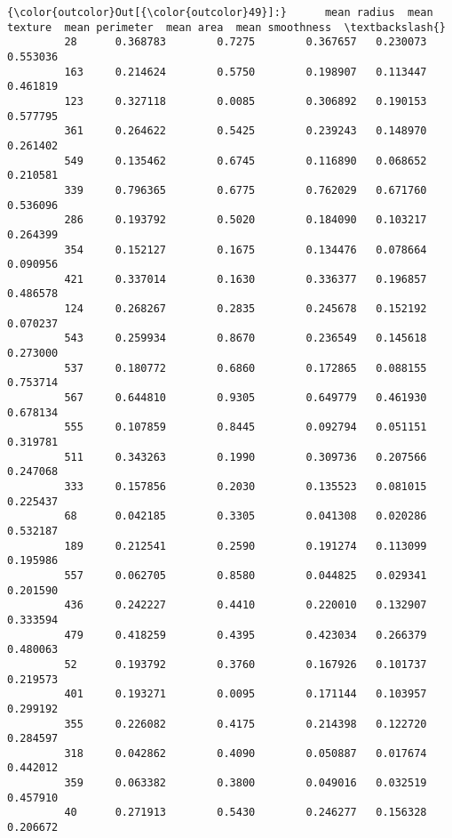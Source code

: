 \documentclass[11pt]{article}
\begin{document}
\begin{Verbatim}[commandchars=\\\{\}]
{\color{outcolor}Out[{\color{outcolor}49}]:}      mean radius  mean texture  mean perimeter  mean area  mean smoothness  \textbackslash{}
         28      0.368783        0.7275        0.367657   0.230073         0.553036   
         163     0.214624        0.5750        0.198907   0.113447         0.461819   
         123     0.327118        0.0085        0.306892   0.190153         0.577795   
         361     0.264622        0.5425        0.239243   0.148970         0.261402   
         549     0.135462        0.6745        0.116890   0.068652         0.210581   
         339     0.796365        0.6775        0.762029   0.671760         0.536096   
         286     0.193792        0.5020        0.184090   0.103217         0.264399   
         354     0.152127        0.1675        0.134476   0.078664         0.090956   
         421     0.337014        0.1630        0.336377   0.196857         0.486578   
         124     0.268267        0.2835        0.245678   0.152192         0.070237   
         543     0.259934        0.8670        0.236549   0.145618         0.273000   
         537     0.180772        0.6860        0.172865   0.088155         0.753714   
         567     0.644810        0.9305        0.649779   0.461930         0.678134   
         555     0.107859        0.8445        0.092794   0.051151         0.319781   
         511     0.343263        0.1990        0.309736   0.207566         0.247068   
         333     0.157856        0.2030        0.135523   0.081015         0.225437   
         68      0.042185        0.3305        0.041308   0.020286         0.532187   
         189     0.212541        0.2590        0.191274   0.113099         0.195986   
         557     0.062705        0.8580        0.044825   0.029341         0.201590   
         436     0.242227        0.4410        0.220010   0.132907         0.333594   
         479     0.418259        0.4395        0.423034   0.266379         0.480063   
         52      0.193792        0.3760        0.167926   0.101737         0.219573   
         401     0.193271        0.0095        0.171144   0.103957         0.299192   
         355     0.226082        0.4175        0.214398   0.122720         0.284597   
         318     0.042862        0.4090        0.050887   0.017674         0.442012   
         359     0.063382        0.3800        0.049016   0.032519         0.457910   
         40      0.271913        0.5430        0.246277   0.156328         0.206672   

\end{Verbatim}
\end{document}
